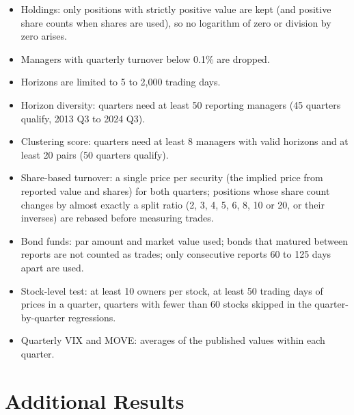 \begin{itemize}[leftmargin=*]
\item Holdings: only positions with strictly positive value are kept (and positive share counts when shares are used), so no logarithm of zero or division by zero arises.
\item Managers with quarterly turnover below 0.1\% are dropped.
\item Horizons are limited to 5 to 2{,}000 trading days.
\item Horizon diversity: quarters need at least 50 reporting managers (45 quarters qualify, 2013 Q3 to 2024 Q3).
\item Clustering score: quarters need at least 8 managers with valid horizons and at least 20 pairs (50 quarters qualify).
\item Share-based turnover: a single price per security (the implied price from reported value and shares) for both quarters; positions whose share count changes by almost exactly a split ratio (2, 3, 4, 5, 6, 8, 10 or 20, or their inverses) are rebased before measuring trades.
\item Bond funds: par amount and market value used; bonds that matured between reports are not counted as trades; only consecutive reports 60 to 125 days apart are used.
\item Stock-level test: at least 10 owners per stock, at least 50 trading days of prices in a quarter, quarters with fewer than 60 stocks skipped in the quarter-by-quarter regressions.
\item Quarterly VIX and MOVE: averages of the published values within each quarter.
\end{itemize}

\section{Additional Results}
\label{app:extra}

